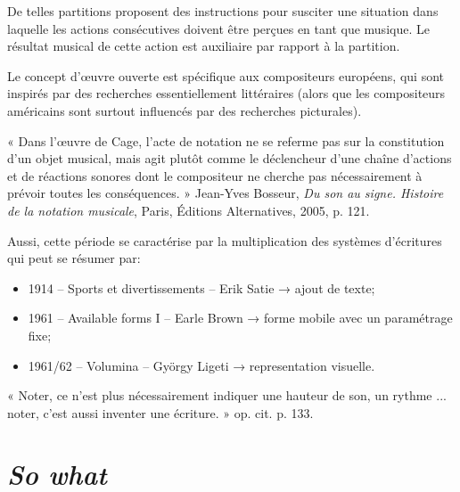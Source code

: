 \documentclass{article}
\begin{document}
De telles partitions proposent des instructions pour susciter une situation dans laquelle les actions consécutives doivent être perçues en tant que musique. Le résultat musical de cette action est auxiliaire par rapport à la partition.


Le concept d'œuvre ouverte est spécifique aux compositeurs européens, qui sont inspirés par des recherches essentiellement littéraires (alors que les compositeurs américains sont surtout influencés par des recherches picturales).

« Dans l'œuvre de Cage, l'acte de notation ne se referme pas sur la constitution d'un objet musical, mais agit plutôt comme le déclencheur d'une chaîne d'actions et de réactions sonores dont le compositeur ne cherche pas nécessairement à prévoir toutes les conséquences. » Jean-Yves Bosseur, \textit{Du son au signe. Histoire de la notation musicale}, Paris, Éditions Alternatives, 2005, p. 121.

Aussi, cette période se caractérise par la multiplication des systèmes d'écritures qui peut se résumer par:
\begin{itemize}
\item 1914 – Sports et divertissements – Erik Satie → ajout de texte;
\item 1961 – Available forms I – Earle Brown → forme mobile avec un paramétrage fixe;
\item 1961/62 – Volumina – György Ligeti → representation visuelle.
\end{itemize}

« Noter, ce n'est plus nécessairement indiquer une hauteur de son, un rythme ... noter, c'est aussi inventer une écriture. » op. cit. p. 133.
 
\section{\textsl{So what}}
\end{document}
